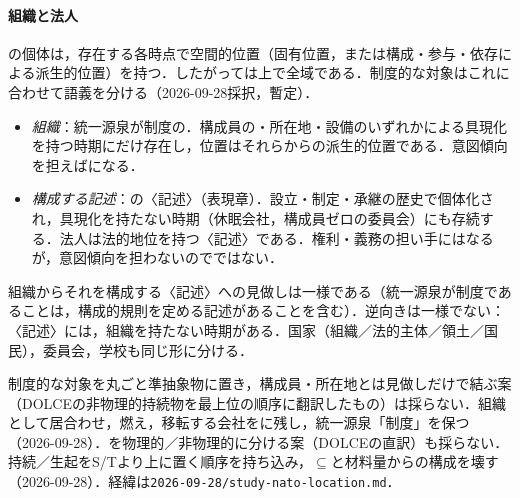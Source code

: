 \documentclass[../../main-detail.tex]{subfiles}
\begin{document}
\paragraph{組織と法人} の個体は，存在する各時点で空間的位置（固有位置，または構成・参与・依存による派生的位置）を持つ．したがっては上で全域である．制度的な対象はこれに合わせて語義を分ける（2026-09-28採択，暫定）．
\begin{itemize}
  \item \emph{組織}：統一源泉が制度の．構成員の・所在地・設備のいずれかによる具現化を持つ時期にだけ存在し，位置はそれらからの派生的位置である．意図傾向を担えばになる．
  \item \emph{構成する記述}：の〈記述〉（表現章）．設立・制定・承継の歴史で個体化され，具現化を持たない時期（休眠会社，構成員ゼロの委員会）にも存続する．法人は法的地位を持つ〈記述〉である．権利・義務の担い手にはなるが，意図傾向を担わないのでではない．
\end{itemize}
組織からそれを構成する〈記述〉への見做しは一様である（統一源泉が制度であることは，構成的規則を定める記述があることを含む）．逆向きは一様でない：〈記述〉には，組織を持たない時期がある．国家（組織／法的主体／領土／国民），委員会，学校も同じ形に分ける．
\begin{whynot}
制度的な対象を丸ごと準抽象物に置き，構成員・所在地とは見做しだけで結ぶ案（DOLCEの非物理的持続物を最上位の順序に翻訳したもの）は採らない．組織として居合わせ，燃え，移転する会社をに残し，統一源泉「制度」を保つ（2026-09-28）．を物理的／非物理的に分ける案（DOLCEの直訳）も採らない．持続／生起をS/Tより上に置く順序を持ち込み，$\subseteq$と材料量からの構成を壊す（2026-09-28）．経緯は\texttt{2026-09-28/study-nato-location.md}．
\end{whynot}
\end{document}
